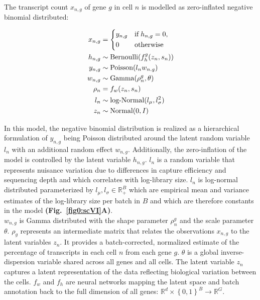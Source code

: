 The transcript count $x_{n,g}$ of gene $g$ in cell $n$ is modelled as zero-inflated negative binomial distributed:

\begin{align*}
x_{n,g} & = 
 \left\lbrace
  \begin{aligned}
    & y_{n,g} && \textnormal{if} \; h_{n,g} = 0,  \\ 
    & 0 && \textnormal{otherwise}    	    
  \end{aligned}
\right.\\
h_{n,g} & \sim \textnormal{Bernoulli}(f_h^g(z_n,s_n))\\
y_{n,g} & \sim \textnormal{Poisson}(l_nw_{n.g})\\
w_{n,g} & \sim \textnormal{Gamma}(\rho^g_n, \theta)\\
\rho_n & = f_w(z_n,s_n)\\
l_n & \sim \textnormal{log-Normal}(l_{\mu},l^2_{\sigma})\\
z_n & \sim \textnormal{Normal}(0,I)
\end{align*}


In this model, the negative binomial distribution is realized as a hierarchical formulation of $y_{n,g}$ being Poisson distributed around the latent random variable $l_n$ with an additional random effect $w_{n,g}$. Additionally, the zero-inflation of the model is controlled by the latent variable $h_{n,g}$. $l_n$ is a random variable that represents nuisance variation due to differences in capture efficiency and sequencing depth and which correlates with log-library size. $l_n$ is log-normal distributed parameterized by $l_\mu,l_\sigma\in\mathbb{R}^B_+$ which are empirical mean and variance estimates of the log-library size per batch in $B$ and which are therefore constants in the model \textbf{(Fig.~\ref{fig0:scVI}A)}.\\

$w_{n,g}$ is Gamma distributed with the shape parameter $\rho_n^g$ and the scale parameter $\theta$. $\rho_g$ represents an intermediate matrix that relates the observations $x_{n,g}$ to the latent variables $z_n$. It provides a batch-corrected, normalized estimate of the percentage of transcripts in each cell $n$ from each gene $g$. $\theta$ is a global inverse-dispersion variable shared across all genes and all cells. The latent variable $z_n$ captures a latent representation of the data reflecting biological variation between the cells. $f_w$ and $f_h$ are neural networks mapping the latent space and batch annotation back to the full dimension of all genes: $\mathbb{R}^d\times{}\left\lbrace0,1\right\rbrace^B\rightarrow\mathbb{R}^G$.\\

